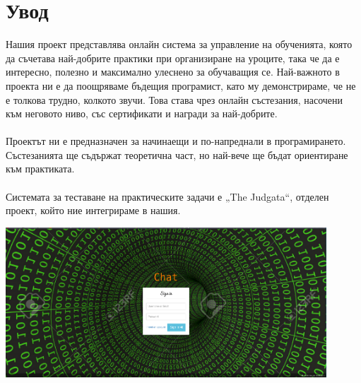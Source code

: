 \documentclass[12pt]{article}
\begin{document}
	\section{Увод}
	Нашия проект представлява онлайн система за управление на обученията, която да съчетава най-добрите практики при организиране на уроците, така че да е интересно, полезно и максимално улеснено за обучаващия се. Най-важното в проекта ни е да поощряваме бъдещия програмист, като му демонстрираме, че не е толкова трудно, колкото звучи. Това става чрез онлайн състезания, насочени към неговото ниво, със сертификати и награди за най-добрите. \\
	\\
	Проектът ни е предназначен за начинаещи и по-напреднали в програмирането. Състезанията ще съдържат теоретична част, но най-вече ще бъдат ориентиране към практиката. \\
	\\
	Системата за теставане на практическите задачи е „\foreignlanguage{english}{The Judgata}“, отделен проект, който ние интегрираме в нашия. \\\vspace{0.5cm}
	
	\includegraphics[width=0.9\textwidth]{chat} \\
	\newpage
\end{document}
